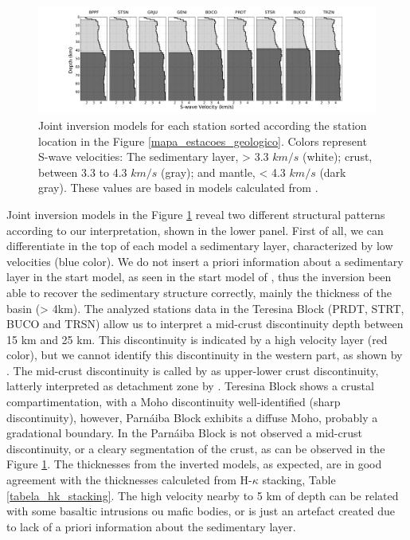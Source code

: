 \documentclass[paper,11pt]{geophysics}
\begin{document}
\begin{figure}[!ht]
\centering
\includegraphics[width=1\textwidth]{Fig/section_joint_inversion_25.png}
\caption{Joint inversion models for each station sorted according the station location in the Figure \ref{mapa_estacoes_geologico}. Colors represent S-wave velocities: The sedimentary layer, > 3.3 $km/s$ (white); crust, between 3.3 to 4.3 $km/s$ (gray); and mantle, < 4.3 $km/s$ (dark gray). These values are based in models calculated from \cite{mooney_crust_1998}.}
\label{moisaic_joint_inversion}
\end{figure}

Joint inversion models in the Figure \ref{moisaic_joint_inversion} reveal two different structural patterns according to our interpretation, shown in the lower panel.  First of all, we can differentiate in the top of each model a sedimentary layer, characterized by low velocities (blue color). We do not insert a priori information about a sedimentary layer in the start model, as seen in the start model of \cite{almeida_crustal_2015}, thus the inversion been able to recover the sedimentary structure correctly, mainly the thickness of the basin (> 4km). The analyzed stations data in the Teresina Block (PRDT, STRT, BUCO and TRSN) allow us to interpret a mid-crust discontinuity depth between 15 km and 25 km. This discontinuity is indicated by a high velocity layer (red color), but we cannot identify this discontinuity in the western part, as shown by \cite{daly_brasiliano_2014}. The mid-crust discontinuity is called by \cite{pavao_upper_lower_2013} as upper-lower crust discontinuity, latterly interpreted as detachment zone by \cite{almeida_crustal_2015}. Teresina Block shows a crustal compartimentation, with a Moho discontinuity well-identified (sharp discontinuity), however, Parnáiba Block exhibits a diffuse Moho, probably a gradational boundary. In the Parnáiba Block is not observed a mid-crust discontinuity, or a cleary segmentation of the crust, as can be observed in the Figure \ref{moisaic_joint_inversion}. The thicknesses from the inverted models, as expected, are in good agreement with the thicknesses calculeted from H-$\kappa$ stacking, Table \ref{tabela_hk_stacking}. The high velocity nearby to 5 km of depth can be related with some basaltic intrusions ou mafic bodies, or is just an artefact created due to lack of a priori information about the sedimentary layer.
\end{document}
